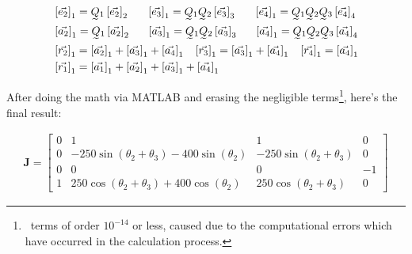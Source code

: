 \documentclass[conference]{IEEEtran}
\begin{document}
\begin{align*}
     & \left[\vec{e_2}\right]_1 = \undertilde{Q}_1 \left[\vec{e_2}\right]_2                                       \hspace{17px}
    \left[\vec{e_3}\right]_1 = \undertilde{Q}_1 \undertilde{Q}_2 \left[\vec{e_3}\right]_3                       \hspace{17px}
    \left[\vec{e_4}\right]_1 = \undertilde{Q}_1 \undertilde{Q}_2 \undertilde{Q}_3 \left[\vec{e_4}\right]_4                                               \\
     & \left[\vec{a_2}\right]_1 = \undertilde{Q}_1 \left[\vec{a_2}\right]_2                                       \hspace{16px}
    \left[\vec{a_3}\right]_1 = \undertilde{Q}_1 \undertilde{Q}_2 \left[\vec{a_3}\right]_3                       \hspace{16px}
    \left[\vec{a_4}\right]_1 = \undertilde{Q}_1 \undertilde{Q}_2 \undertilde{Q}_3 \left[\vec{a_4}\right]_4                                               \\
     & \left[\vec{r_2}\right]_1 = \left[\vec{a_2}\right]_1 + \left[\vec{a_3}\right]_1 + \left[\vec{a_4}\right]_1  \hspace{9px}
    \left[\vec{r_3}\right]_1 = \left[\vec{a_3}\right]_1 + \left[\vec{a_4}\right]_1                              \hspace{9px}
    \left[\vec{r_4}\right]_1 = \left[\vec{a_4}\right]_1                                                                                                  \\
     & \left[\vec{r_1}\right]_1 = \left[\vec{a_1}\right]_1 + \left[\vec{a_2}\right]_1 + \left[\vec{a_3}\right]_1 + \left[\vec{a_4}\right]_1 \label{eq:r}
\end{align*}

After doing the math via MATLAB and erasing the negligible terms\footnote{\, terms of order $10^{-14}$ or less, caused due to the computational errors which have occurred in the calculation process.}, here's the final result:
\begin{small}
    \begin{align*}
        \mathbf{J} = \begin{bmatrix}
                         0 & 1                                                                            & 1                                            & 0  \\
                         0 & -250\sin\left(\theta _{2}+\theta _{3}\right)-400\sin\left(\theta _{2}\right) & -250\sin\left(\theta _{2}+\theta _{3}\right) & 0  \\
                         0 & 0                                                                            & 0                                            & -1 \\
                         1 & 250\cos\left(\theta _{2}+\theta _{3}\right)+400\cos\left(\theta _{2}\right)  & 250\cos\left(\theta _{2}+\theta _{3}\right)  & 0
                     \end{bmatrix}
    \end{align*}
\end{small}
\end{document}
